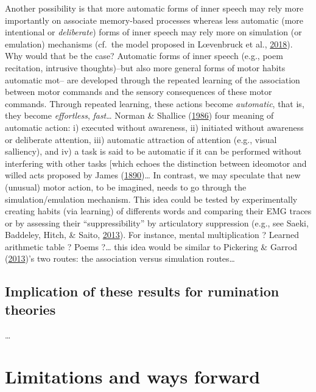 \documentclass[a4paper,12pt,twoside,openright,oldfontcommands]{memoir}
\begin{document}
Another possibility is that more automatic forms of inner speech may rely more importantly on associate memory-based processes whereas less automatic (more intentional or \emph{deliberate}) forms of inner speech may rely more on simulation (or emulation) mechanisms (cf.~the model proposed in Lœvenbruck et al., \protect\hyperlink{ref-loevenbruck_cognitive_2018}{2018}). Why would that be the case? Automatic forms of inner speech (e.g., poem recitation, intrusive thoughts)--but also more general forms of motor habits automatic mot-- are developed through the repeated learning of the association between motor commands and the sensory consequences of these motor commands. Through repeated learning, these actions become \emph{automatic}, that is, they become \emph{effortless}, \emph{fast}\ldots{} Norman \& Shallice (\protect\hyperlink{ref-norman_attention_1986}{1986}) four meaning of automatic action: i) executed without awareness, ii) initiated without awareness or deliberate attention, iii) automatic attraction of attention (e.g., visual salliency), and iv) a task is said to be automatic if it can be performed without interfering with other tasks {[}which echoes the distinction between ideomotor and willed acts proposed by James (\protect\hyperlink{ref-james_principles_1890}{1890})\ldots{} In contrast, we may speculate that new (unusual) motor action, to be imagined, needs to go through the simulation/emulation mechanism. This idea could be tested by experimentally creating habits (via learning) of differents words and comparing their EMG traces or by assessing their \enquote{suppressibility} by articulatory suppression (e.g., see Saeki, Baddeley, Hitch, \& Saito, \protect\hyperlink{ref-saeki_breaking_2013}{2013}). For instance, mental multiplication ? Learned arithmetic table ? Poems ?\ldots{} this idea would be similar to Pickering \& Garrod (\protect\hyperlink{ref-pickering_integrated_2013}{2013})'s two routes: the association versus simulation routes\ldots{}

\hypertarget{implication-of-these-results-for-rumination-theories}{%
\subsection{Implication of these results for rumination theories}\label{implication-of-these-results-for-rumination-theories}}

\ldots{}

\hypertarget{limitations-and-ways-forward}{%
\section{Limitations and ways forward}\label{limitations-and-ways-forward}}
\end{document}
